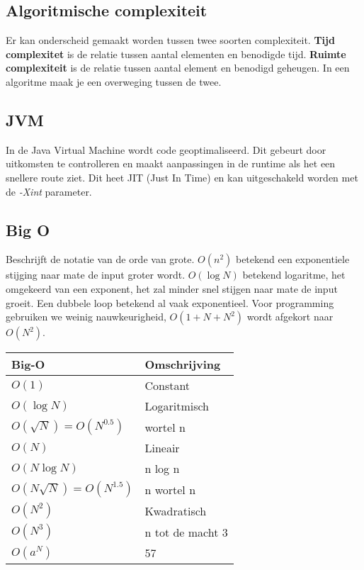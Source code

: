 \subsection{Algoritmische complexiteit}
Er kan onderscheid gemaakt worden tussen twee soorten complexiteit.
\textbf{Tijd complexitet} is de relatie tussen aantal elementen en benodigde tijd.
\textbf{Ruimte complexiteit} is de relatie tussen aantal element en benodigd geheugen.
In een algoritme maak je een overweging tussen de twee.

\subsection{JVM}
In de Java Virtual Machine wordt code geoptimaliseerd.
Dit gebeurt door uitkomsten te controlleren en maakt aanpassingen in de runtime als het een snellere route ziet.
Dit heet JIT (Just In Time) en kan uitgeschakeld worden met de \textit{-Xint} parameter.

\subsection{Big O}
Beschrijft de notatie van de orde van grote.
$O(n^2)$ betekend een exponentiele stijging naar mate de input groter wordt.
$O(\log N)$ betekend logaritme, het omgekeerd van een exponent, het zal minder snel stijgen naar mate de input groeit.
Een dubbele loop betekend al vaak exponentieel.
Voor programming gebruiken we weinig nauwkeurigheid, $O(1+N+N^2)$ wordt afgekort naar $O(N^2)$.

\begin{center}
    \begin{tabular}{ll}
        Big-O                           & Omschrijving \\
        \midrule
        $O(1)$                          & Constant \\
        $O(\log N)$                     & Logaritmisch \\
        $O(\sqrt{N}) = O(N^{0.5})$      & wortel n \\
        $O(N)$                          & Lineair \\
        $O(N \log N)$                   & n log n \\
        $O(N \sqrt{N}) = O(N^{1.5})$    & n wortel n \\
        $O(N^2)$                        & Kwadratisch \\
        $O(N^3)$                        & n tot de macht 3 \\
        $O(a^N)$                        & 57 \\
        \bottomrule
    \end{tabular}
\end{center}
